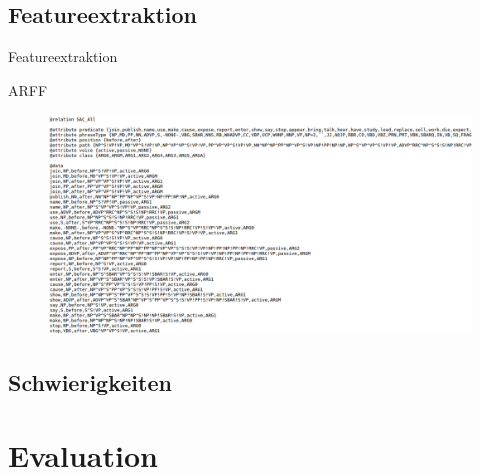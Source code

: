 \documentclass[10pt]{beamer}
\begin{document}


\subsection{Featureextraktion}

\begin{frame}{Featureextraktion}
  
\end{frame}

\begin{frame}{ARFF}
 \begin{figure}
    \includegraphics[scale=0.3]{arff}
 \end{figure}

\end{frame}



\subsection{Schwierigkeiten}
\section{Evaluation}
\end{document}
